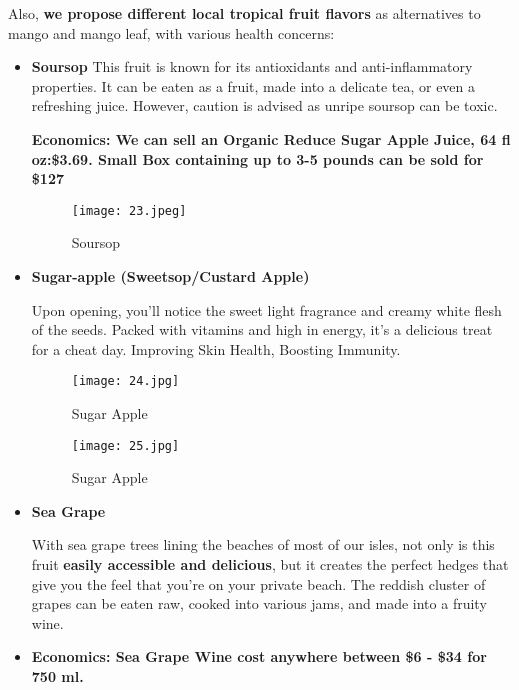 \documentclass{article}
\begin{document}
Also,\textbf{ we propose different local tropical fruit flavors }as alternatives to mango and mango leaf, with various health concerns:
    \begin{itemize}
        \item \textbf{Soursop}
        This fruit is known for its antioxidants and anti-inflammatory properties. It can be eaten as a fruit, made into a delicate tea, or even a refreshing juice. However, caution is advised as unripe soursop can be toxic.\par
        \textbf{Economics: We can sell an Organic Reduce Sugar Apple Juice, 64 fl oz:\$3.69. Small Box containing up to 3-5 pounds can be sold for \$127}\par

\begin{figure}[H]
        \centering
        \texttt{[image: 23.jpeg]}
        \caption{Soursop}
        \label{fig:plant}
        \end{figure}

        
        \item \textbf{Sugar-apple (Sweetsop/Custard Apple)}\par
        Upon opening, you’ll notice the sweet light fragrance and creamy white flesh of the seeds. Packed with vitamins and high in energy, it’s a delicious treat for a cheat day. Improving Skin Health, Boosting Immunity.

        \begin{figure}[H]
        \centering
        \texttt{[image: 24.jpg]}
        \caption{Sugar Apple}
        \label{fig:plant}
        \end{figure}
        
        \begin{figure}[H]
        \centering
        \texttt{[image: 25.jpg]}
        \caption{Sugar Apple}
        \label{fig:plant}
        \end{figure}
        
    \item \textbf{Sea Grape}\par
    With sea grape trees lining the beaches of most of our isles, not only is this fruit \textbf{easily accessible and delicious}, but it creates the perfect hedges that give you the feel that you’re on your private beach. The reddish cluster of grapes can be eaten raw, cooked into various jams, and made into a fruity wine.\par
    \item \textbf{Economics: Sea Grape Wine cost anywhere between \$6 - \$34 for 750 ml.}\par
    \end{itemize}
\end{document}
